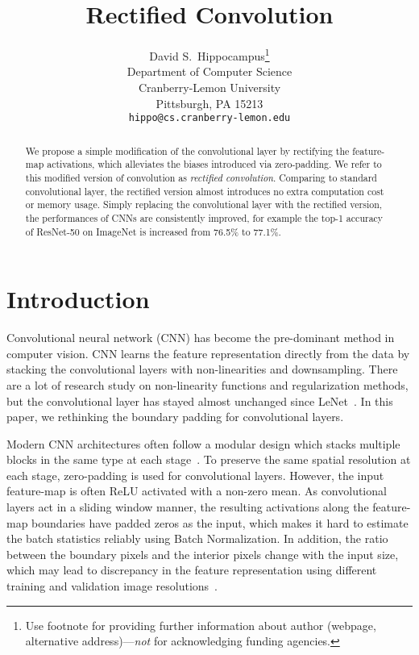 \documentclass{article}
\title{Rectified Convolution}
\author{%
  David S.~Hippocampus\thanks{Use footnote for providing further information
    about author (webpage, alternative address)---\emph{not} for acknowledging
    funding agencies.} \\
  Department of Computer Science\\
  Cranberry-Lemon University\\
  Pittsburgh, PA 15213 \\
  \texttt{hippo@cs.cranberry-lemon.edu} \\
}
\begin{document}
\maketitle

\begin{abstract}
  
  We propose a simple modification of the convolutional layer by rectifying the feature-map activations, which alleviates the biases introduced via zero-padding. We refer to this modified version of convolution as {\em rectified convolution}. 
  Comparing to standard convolutional layer, the rectified version almost introduces no extra computation cost or memory usage. 
  Simply replacing the convolutional layer with the rectified version, the performances of CNNs are consistently improved, for example the top-1 accuracy of ResNet-50 on ImageNet is increased from 76.5\% to 77.1\%. %
  
  
\end{abstract}

\section{Introduction}


Convolutional neural network (CNN) has become the pre-dominant method in computer vision. 
CNN learns the feature representation directly from the data by stacking the convolutional layers with non-linearities and downsampling. 
There are a lot of research study on non-linearity functions and regularization methods, but the convolutional layer has stayed almost unchanged since LeNet~\cite{lecun1998gradient}. In this paper, we rethinking the boundary padding for convolutional layers. %


Modern CNN architectures often follow a modular design which stacks multiple blocks in the same type at each stage~\cite{simonyan2014very,he2015deep}. 
To preserve the same spatial resolution at each stage, zero-padding is used for convolutional layers. 
However, the input feature-map is often ReLU activated with a non-zero mean. 
As convolutional layers act in a sliding window manner, the resulting activations along the feature-map boundaries have padded zeros as the input, which makes it hard to estimate the batch statistics reliably using Batch Normalization. 
In addition, the ratio between the boundary pixels and the interior pixels change with the input size, which may lead to discrepancy in the feature representation using different training and validation image resolutions~\cite{touvron2019fixing}. 
\end{document}
